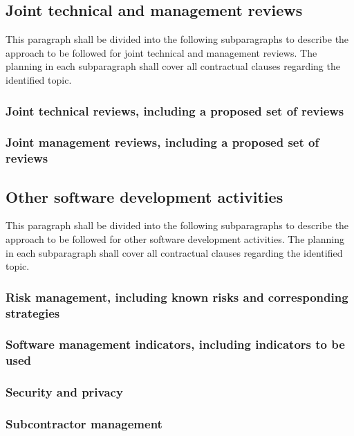 \subsection{Joint technical and management reviews}

This paragraph shall be divided into the following subparagraphs to
describe the approach to be followed for joint technical and management
reviews. The planning in each subparagraph shall cover all contractual
clauses regarding the identified topic.

\subsubsection{Joint technical reviews, including a proposed set of
reviews}

\subsubsection{Joint management reviews, including a proposed set of
reviews}

\subsection{Other software development activities}

This paragraph shall be divided into the following subparagraphs to
describe the approach to be followed for other software development
activities. The planning in each subparagraph shall cover all
contractual clauses regarding the identified topic.

\subsubsection{Risk management, including known risks and corresponding
strategies}

\subsubsection{Software management indicators, including indicators to
be used}

\subsubsection{Security and privacy}

\subsubsection{Subcontractor management}

